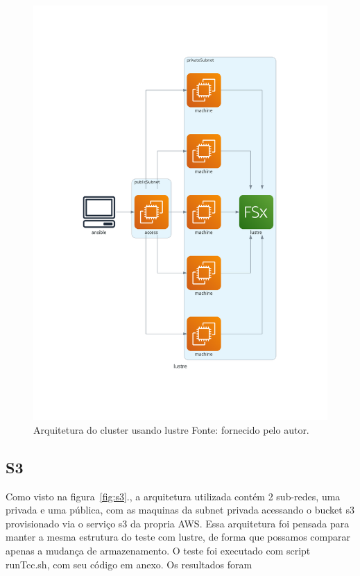\documentclass[article,a4paper,12pt,brazil,sumario=tradicional]{abntex2}
\begin{document}
\begin{figure}[htb]
	\centering
	\includegraphics[width=1\textwidth]{lustre.png}
	\caption{Arquitetura do cluster usando lustre Fonte: fornecido pelo autor.}
	\label{fig:lustre}
\end{figure}

\subsection{S3}
Como visto na figura~\ref{fig:s3}., a arquitetura utilizada contém 2 sub-redes, uma privada e uma pública, com as maquinas da subnet privada acessando o bucket s3 provisionado via o serviço s3 da propria AWS. Essa arquitetura foi pensada para manter a mesma estrutura do teste com lustre, de forma que possamos comparar apenas a mudança de armazenamento. O teste foi executado com script runTcc.sh, com seu código em anexo. Os resultados foram
\end{document}
